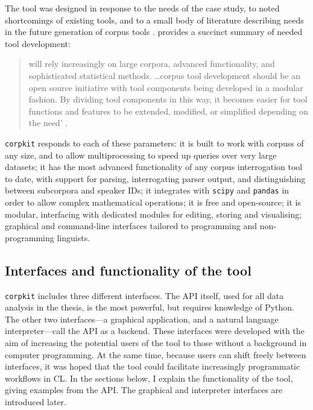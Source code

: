 The tool was designed in response to the needs of the case study, to noted shortcomings of existing tools, and to a small body of literature describing needs in the future generation of \gls{corpus} tools \cite[e.g.][]{anthony_critical_2013,anthony_developing_2006,gries_50-something_2013}. \textcite{anthony_critical_2013} provides a succinct summary of needed tool development:

\begin{quote} \small {} will rely increasingly on large corpora, advanced functionality, and sophisticated statistical methods. \ldots \Gls{corpus} tool development should be an open source initiative with tool components being developed in a modular fashion. By dividing tool components in this way, it becomes easier for tool functions and features to be extended, modified, or simplified depending on the need' \parencite*[pp.~155--156]{anthony_critical_2013}.
\end{quote}
%
\texttt{corpkit} responds to each of these parameters: it is built to work with \glspl{corpus} of any size, and to allow multiprocessing to speed up queries over very large datasets; it has the most advanced functionality of any corpus interrogation tool to date, with support for parsing, interrogating parser output, and distinguishing between subcorpora and speaker IDs; it integrates with \texttt{scipy} \cite{scipy2001} and \texttt{pandas} \cite{mckinney_pandas_2010} in order to allow complex mathematical operations; it is free and open\hyp{}source; it is modular, interfacing with dedicated modules for editing, storing and visualising; graphical and command\hyp{}line interfaces tailored to programming and non\hyp{}programming linguists.

\subsection{Interfaces and functionality of the tool}

\texttt{corpkit} includes three different interfaces. The \gls{API} itself, used for all data analysis in the thesis, is the most powerful, but requires knowledge of Python. The other two interfaces---a graphical application, and a natural language interpreter---call the \gls{API} as a backend. These interfaces were developed with the aim of increasing the potential users of the tool to those without a background in computer programming. At the same time, because users can shift freely between interfaces, it was hoped that the tool could facilitate increasingly programmatic workflows in \gls{CL}. In the sections below, I explain the functionality of the tool, giving examples from the \gls{API}. The graphical and interpreter interfaces are introduced later.

